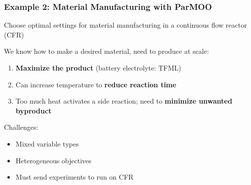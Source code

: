 \documentclass[aspectratio=169]{beamer}
\begin{document}
\begin{frame}\frametitle{Example 2: Material Manufacturing with ParMOO}
Choose optimal settings for material manufacturing in a
continuous flow reactor (CFR)

\bigskip

We know how to make a desired material, need to produce at scale:

\begin{enumerate}
\item {\color{green} \bf Maximize the product} (battery electrolyte: TFML)
\item Can increase temperature to {\bf \color{red} reduce reaction time}
\item Too much heat activates a side reaction; need to
{\bf \color{blue} minimize unwanted byproduct}
\end{enumerate}

\bigskip
Challenges:

\begin{itemize}
\item Mixed variable types
\item Heterogeneous objectives
\item Must send experiments to run on CFR
\end{itemize}
\end{frame}
\end{document}
